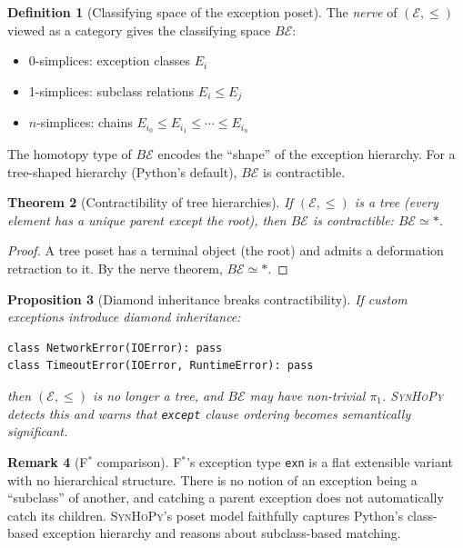 \documentclass[11pt,a4paper]{report}
\theoremstyle{definition}
\newtheorem{definition}{Definition}[chapter]
\newtheorem{remark}[definition]{Remark}
\theoremstyle{plain}
\newtheorem{theorem}[definition]{Theorem}
\newtheorem{proposition}[definition]{Proposition}
\newcommand{\fstar}{F$^{*}$}
\newcommand{\synhopy}{\textsc{SynHoPy}}
\begin{document}
\begin{definition}[Classifying space of the exception poset]
The \emph{nerve} of $(\mathcal{E}, \leq)$ viewed as a category gives the
classifying space $B\mathcal{E}$:
\begin{itemize}
  \item 0-simplices: exception classes $E_i$
  \item 1-simplices: subclass relations $E_i \leq E_j$
  \item $n$-simplices: chains $E_{i_0} \leq E_{i_1} \leq \cdots \leq E_{i_n}$
\end{itemize}
The homotopy type of $B\mathcal{E}$ encodes the ``shape'' of the exception
hierarchy.  For a tree-shaped hierarchy (Python's default), $B\mathcal{E}$
is contractible.
\end{definition}

\begin{theorem}[Contractibility of tree hierarchies]
If $(\mathcal{E}, \leq)$ is a tree (every element has a unique parent except
the root), then $B\mathcal{E}$ is contractible: $B\mathcal{E} \simeq *$.
\end{theorem}
\begin{proof}
A tree poset has a terminal object (the root) and admits a deformation
retraction to it.  By the nerve theorem, $B\mathcal{E} \simeq *$.
\end{proof}

\begin{proposition}[Diamond inheritance breaks contractibility]
If custom exceptions introduce diamond inheritance:
\begin{lstlisting}[style=python]
class NetworkError(IOError): pass
class TimeoutError(IOError, RuntimeError): pass
\end{lstlisting}
then $(\mathcal{E}, \leq)$ is no longer a tree, and $B\mathcal{E}$ may have
non-trivial $\pi_1$.  \synhopy{} detects this and warns that \texttt{except}
clause ordering becomes semantically significant.
\end{proposition}

\begin{remark}[\fstar{} comparison]
\fstar{}'s exception type \lstinline[style=fstar]|exn| is a flat extensible
variant with no hierarchical structure.  There is no notion of an exception
being a ``subclass'' of another, and catching a parent exception does not
automatically catch its children.  \synhopy{}'s poset model faithfully
captures Python's class-based exception hierarchy and reasons about
subclass-based matching.
\end{remark}
\end{document}
